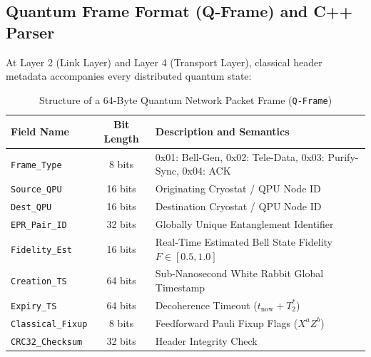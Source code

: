 \subsection{Quantum Frame Format (Q-Frame) and C++ Parser}
At Layer 2 (Link Layer) and Layer 4 (Transport Layer), classical header metadata accompanies every distributed quantum state:

\begin{table}[htbp]
\centering
\small
\caption{Structure of a 64-Byte Quantum Network Packet Frame (\texttt{Q-Frame})}
\label{tab:qframe_packet_spec}
\begin{tabularx}{\textwidth}{p{3.5cm} c X}
\toprule
\textbf{Field Name} & \textbf{Bit Length} & \textbf{Description and Semantics} \\
\midrule
\texttt{Frame\_Type} & 8 bits & 0x01: Bell-Gen, 0x02: Tele-Data, 0x03: Purify-Sync, 0x04: ACK \\
\texttt{Source\_QPU} & 16 bits & Originating Cryostat / QPU Node ID \\
\texttt{Dest\_QPU} & 16 bits & Destination Cryostat / QPU Node ID \\
\texttt{EPR\_Pair\_ID} & 32 bits & Globally Unique Entanglement Identifier \\
\texttt{Fidelity\_Est} & 16 bits & Real-Time Estimated Bell State Fidelity $F \in [0.5, 1.0]$ \\
\texttt{Creation\_TS} & 64 bits & Sub-Nanosecond White Rabbit Global Timestamp \\
\texttt{Expiry\_TS} & 64 bits & Decoherence Timeout ($t_{\text{now}} + T_2^*$) \\
\texttt{Classical\_Fixup} & 8 bits & Feedforward Pauli Fixup Flags ($X^a Z^b$) \\
\texttt{CRC32\_Checksum} & 32 bits & Header Integrity Check \\
\bottomrule
\end{tabularx}
\end{table}

